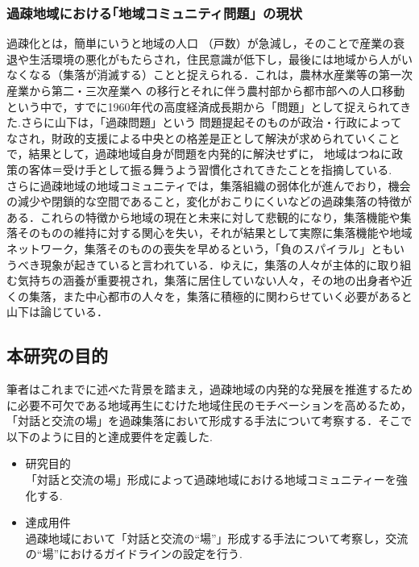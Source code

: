 \documentclass[a4paper]{jsarticle}
\begin{document}
\subsubsection{過疎地域における｢地域コミュニティ問題」の現状}
過疎化とは，簡単にいうと地域の人口 （戸数）が急減し，そのことで産業の衰 退や生活環境の悪化がもたらされ，住民意識が低下し，最後には地域から人がいなくなる（集落が消滅する）ことと捉えられる．\cite{3}これは，農林水産業等の第一次産業から第二・三次産業へ の移行とそれに伴う農村部から都市部への人口移動という中で，すでに1960年代の高度経済成長期から「問題」として捉えられてきた.\cite{4}さらに山下は，「過疎問題」という 問題提起そのものが政治・行政によってなされ，財政的支援による中央との格差是正として解決が求められていくことで，結果として，過疎地域自身が問題を内発的に解決せずに， 地域はつねに政策の客体＝受け手として振る舞うよう習慣化されてきたことを指摘している.\cite{5}
　さらに過疎地域の地域コミュニティでは，集落組織の弱体化が進んでおり，機会の減少や閉鎖的な空間であること，変化がおこりにくいなどの過疎集落の特徴がある．これらの特徴から地域の現在と未来に対して悲観的になり，集落機能や集落そのものの維持に対する関心を失い，それが結果として実際に集落機能や地域ネットワーク，集落そのものの喪失を早めるという，「負のスパイラル」ともいうべき現象が起きていると言われている．\cite{6}ゆえに，集落の人々が主体的に取り組む気持ちの涵養が重要視され，集落に居住していない人々，その地の出身者や近くの集落，また中心都市の人々を，集落に積極的に関わらせていく必要があると山下は論じている．\cite{7}


\subsection{本研究の目的}
筆者はこれまでに述べた背景を踏まえ，過疎地域の内発的な発展を推進するために必要不可欠である地域再生にむけた地域住民のモチベーションを高めるため，「対話と交流の場」を過疎集落において形成する手法について考察する．そこで以下のように目的と達成要件を定義した.
\begin{itemize}
\item 研究目的　\\「対話と交流の場」形成によって過疎地域における地域コミュニティーを強化する.

\item 達成用件\\過疎地域において「対話と交流の“場”」形成する手法について考察し，交流の“場”におけるガイドラインの設定を行う.

\end{itemize}
\end{document}
